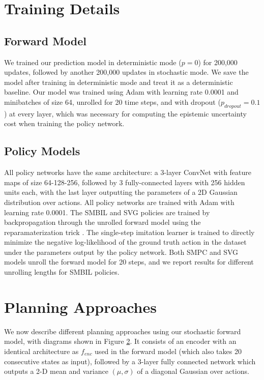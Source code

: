 \documentclass{article} %
\begin{document}
    \section{Training Details}
    \label{training-details-appendix}

    \subsection{Forward Model}
    We trained our prediction model in deterministic mode ($p=0$) for 200,000 updates, followed by another 200,000 updates in stochastic mode.
    We save the model after training in deterministic mode and treat it as a deterministic baseline.
    Our model was trained using Adam \citep{ADAM} with learning rate 0.0001 and minibatches of size 64, unrolled for 20 time steps, and with dropout ($p_{dropout}=0.1$) at every layer, which was necessary for computing the epistemic uncertainty cost when training the policy network.

    \subsection{Policy Models}

    All policy networks have the same architecture: a 3-layer ConvNet with feature maps of size 64-128-256, followed by 3 fully-connected layers with 256 hidden units each, with the last layer outputting the parameters of a 2D Gaussian distribution over actions. All policy networks are trained with Adam with learning rate 0.0001. The SMBIL and SVG policies are trained by backpropagation through the unrolled forward model using the reparamaterization trick \citep{VAE}. The single-step imitation learner is trained to directly minimize the negative log-likelihood of the ground truth action in the dataset under the parameters output by the policy network. Both SMPC and SVG models unroll the forward model for 20 steps, and we report results for different unrolling lengths for SMBIL policies.


\section{Planning Approaches}
  \label{planning-methods}

  We now describe different planning approaches using our stochastic forward model, with diagrams shown in Figure \ref{planning-methods}.
  It consists of an encoder with an identical architecture as $f_{enc}$ used in the forward model (which also takes 20 consecutive states as input), followed by a 3-layer fully connected network which outputs a 2-D mean and variance $(\mu, \sigma)$ of a diagonal Gaussian over actions.
\end{document}
